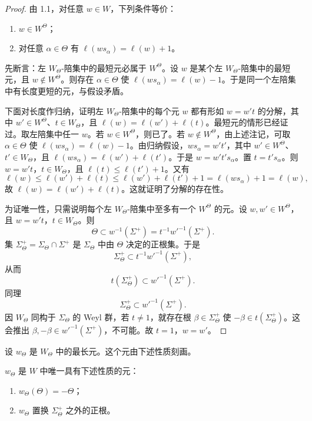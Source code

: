 \begin{proof}
由 1.1，对任意 $w\in W$，下列条件等价：
\begin{enumerate}[label=(\roman*)]
\item $w\in W^\Theta$；
\item 对任意 $\alpha\in\Theta$ 有 $\ell(ws_\alpha)=\ell(w)+1$。
\end{enumerate}

先断言：左 $W_\Theta$-陪集中的最短元必属于 $W^\Theta$。设 $w$ 是某个左 $W_\Theta$-陪集中的最短元，且 $w\notin W^\Theta$。则存在 $\alpha\in\Theta$ 使 $\ell(ws_\alpha)=\ell(w)-1$。于是同一个左陪集中有长度更短的元，与假设矛盾。

下面对长度作归纳，证明左 $W_\Theta$-陪集中的每个元 $w$ 都有形如 $w=w't$ 的分解，其中 $w'\in W^\Theta$、$t\in W_\Theta$，且 $\ell(w)=\ell(w')+\ell(t)$。最短元的情形已经证过。取左陪集中任一 $w$。若 $w\in W^\Theta$，则已了。若 $w\notin W^\Theta$，由上述注记，可取 $\alpha\in\Theta$ 使 $\ell(ws_\alpha)=\ell(w)-1$。由归纳假设，$ws_\alpha=w't'$，其中 $w'\in W^\Theta$、$t'\in W_\Theta$，且 $\ell(ws_\alpha)=\ell(w')+\ell(t')$。于是 $w=w't's_\alpha$。置 $t=t's_\alpha$。则 $w=w't$，$t\in W_\Theta$，且 $\ell(t)\le\ell(t')+1$。又有
$$\ell(w)\le\ell(w')+\ell(t)\le\ell(w')+\ell(t')+1=\ell(ws_\alpha)+1=\ell(w),$$
故 $\ell(w)=\ell(w')+\ell(t)$。这就证明了分解的存在性。

为证唯一性，只需说明每个左 $W_\Theta$-陪集中至多有一个 $W^\Theta$ 的元。设 $w,w'\in W^\Theta$，且 $w=w't$，$t\in W_\Theta$。则
$$\Theta\subset w^{-1}(\Sigma^+)=t^{-1}w'^{-1}(\Sigma^+).$$
集 $\Sigma^+_\Theta=\Sigma_\Theta\cap\Sigma^+$ 是 $\Sigma_\Theta$ 中由 $\Theta$ 决定的正根集。于是
$$\Sigma^+_\Theta\subset t^{-1}w'^{-1}(\Sigma^+),$$
从而
$$t(\Sigma^+_\Theta)\subset w'^{-1}(\Sigma^+).$$
同理
$$\Sigma^+_\Theta\subset w'^{-1}(\Sigma^+).$$
因 $W_\Theta$ 同构于 $\Sigma_\Theta$ 的 Weyl 群，若 $t\neq 1$，就存在根 $\beta\in\Sigma^+_\Theta$ 使 $-\beta\in t(\Sigma^+_\Theta)$。这会推出 $\beta,-\beta\in w'^{-1}(\Sigma^+)$，不可能。故 $t=1$，$w=w'$。
\end{proof}

设 $w_\Theta$ 是 $W_\Theta$ 中的最长元。这个元由下述性质刻画。

\begin{lemma}\label{lem:06.1.3}
$w_\Theta$ 是 $W$ 中唯一具有下述性质的元：
\begin{enumerate}[label=(\roman*)]
\item $w_\Theta(\Theta)=-\Theta$；
\item $w_\Theta$ 置换 $\Sigma^+_\Theta$ 之外的正根。
\end{enumerate}
\end{lemma}

